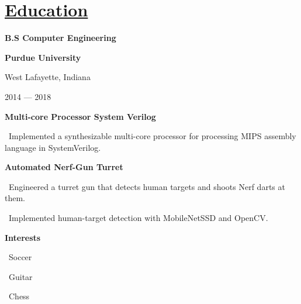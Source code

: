 \documentclass{article}
\begin{document}
\begin{minipage}[t]{3.1in\linewidth\hspace{0.83in}}
    \vspace{2.1em}
    \section{\underline{Education}}
    \large\bfseries{B.S Computer Engineering}

    \bfseries{Purdue University} 

    \small\mdseries\textrm West Lafayette, Indiana

    \small\mdseries\textrm 2014 — 2018

    \vspace{0.4em}

    \small\bfseries\textrm{Multi-core Processor System Verilog}
    
    \vspace{0.3em}
    \small\mdseries
    \hspace{0em}\textasteriskcentered \, \mdseries\textrm{Implemented a synthesizable multi-core processor for processing MIPS assembly language in SystemVerilog.}
    \vspace{0.8em}
    
    \small\bfseries\textrm{Automated Nerf-Gun Turret}
    
    \vspace{0.3em}
    \small\mdseries
    \hspace{0em}\textasteriskcentered \, \mdseries\textrm Engineered a turret gun that detects human targets and shoots Nerf darts at them.

    \vspace{0.5em}
    \small\mdseries
    \hspace{0em}\textasteriskcentered \, \mdseries\textrm Implemented human-target detection with MobileNetSSD and OpenCV.

    \vspace{6.7em}
    \begin{minipage}[t]{3.75in\textwidth\hspace{0in}}
        \large\mdseries\bfseries{Interests}            
        
        \small\mdseries
        \vspace{0.3em}
        \hspace{0.3em}\textasteriskcentered \, \small\mdseries\textrm{Soccer}

        \vspace{0.3em}
        \hspace{0.3em}\textasteriskcentered \, \small\mdseries\textrm{Guitar}        
        
        \vspace{0.3em}
        \hspace{0.3em}\textasteriskcentered \, \small\mdseries\textrm{Chess}

    \end{minipage}

\end{minipage}
\end{document}
